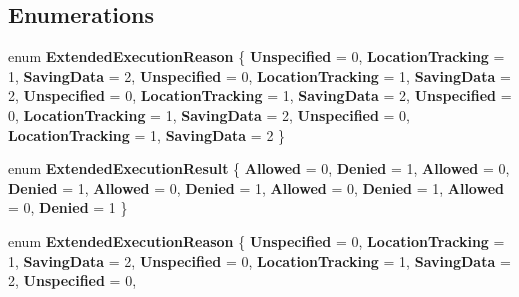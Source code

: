 \subsection*{Enumerations}
\begin{DoxyCompactItemize}
\item 
\mbox{\label{namespace_windows_1_1_application_model_1_1_extended_execution_ad0dba54dc24164e0c6d2e0a29d818528}} 
enum {\bfseries Extended\+Execution\+Reason} \{ \newline
{\bfseries Unspecified} = 0, 
{\bfseries Location\+Tracking} = 1, 
{\bfseries Saving\+Data} = 2, 
{\bfseries Unspecified} = 0, 
\newline
{\bfseries Location\+Tracking} = 1, 
{\bfseries Saving\+Data} = 2, 
{\bfseries Unspecified} = 0, 
{\bfseries Location\+Tracking} = 1, 
\newline
{\bfseries Saving\+Data} = 2, 
{\bfseries Unspecified} = 0, 
{\bfseries Location\+Tracking} = 1, 
{\bfseries Saving\+Data} = 2, 
\newline
{\bfseries Unspecified} = 0, 
{\bfseries Location\+Tracking} = 1, 
{\bfseries Saving\+Data} = 2
 \}
\item 
\mbox{\label{namespace_windows_1_1_application_model_1_1_extended_execution_a24027557babcb8bc4950e24a373e5677}} 
enum {\bfseries Extended\+Execution\+Result} \{ \newline
{\bfseries Allowed} = 0, 
{\bfseries Denied} = 1, 
{\bfseries Allowed} = 0, 
{\bfseries Denied} = 1, 
\newline
{\bfseries Allowed} = 0, 
{\bfseries Denied} = 1, 
{\bfseries Allowed} = 0, 
{\bfseries Denied} = 1, 
\newline
{\bfseries Allowed} = 0, 
{\bfseries Denied} = 1
 \}
\item 
\mbox{\label{namespace_windows_1_1_application_model_1_1_extended_execution_ad0dba54dc24164e0c6d2e0a29d818528}} 
enum {\bfseries Extended\+Execution\+Reason} \{ \newline
{\bfseries Unspecified} = 0, 
{\bfseries Location\+Tracking} = 1, 
{\bfseries Saving\+Data} = 2, 
{\bfseries Unspecified} = 0, 
\newline
{\bfseries Location\+Tracking} = 1, 
{\bfseries Saving\+Data} = 2, 
{\bfseries Unspecified} = 0, 

\end{DoxyCompactItemize}
